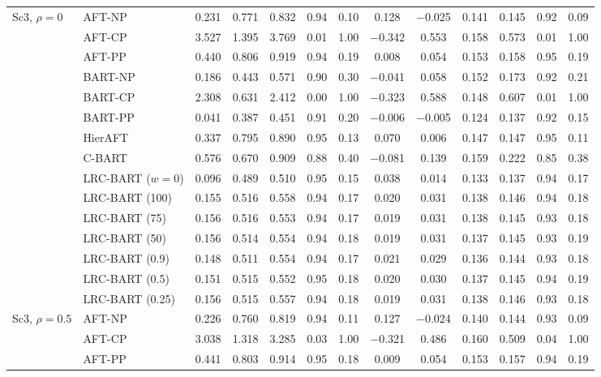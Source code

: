 \begin{center}
\begin{longtable}{llccccccccccc}
\midrule
\multirow{15}{*}{Sc3, $\rho=0$} & AFT-NP & 0.231 & 0.771 & 0.832 & 0.94 & 0.10 & 0.128 & $-$0.025 & 0.141 & 0.145 & 0.92 & 0.09 \\
& AFT-CP & 3.527 & 1.395 & 3.769 & 0.01 & 1.00 & $-$0.342 & 0.553 & 0.158 & 0.573 & 0.01 & 1.00 \\
& AFT-PP & 0.440 & 0.806 & 0.919 & 0.94 & 0.19 & 0.008 & 0.054 & 0.153 & 0.158 & 0.95 & 0.19 \\
& BART-NP & 0.186 & 0.443 & 0.571 & 0.90 & 0.30 & $-$0.041 & 0.058 & 0.152 & 0.173 & 0.92 & 0.21 \\
& BART-CP & 2.308 & 0.631 & 2.412 & 0.00 & 1.00 & $-$0.323 & 0.588 & 0.148 & 0.607 & 0.01 & 1.00 \\
& BART-PP & 0.041 & 0.387 & 0.451 & 0.91 & 0.20 & $-$0.006 & $-$0.005 & 0.124 & 0.137 & 0.92 & 0.15 \\
& HierAFT & 0.337 & 0.795 & 0.890 & 0.95 & 0.13 & 0.070 & 0.006 & 0.147 & 0.147 & 0.95 & 0.11 \\
& C-BART & 0.576 & 0.670 & 0.909 & 0.88 & 0.40 & $-$0.081 & 0.139 & 0.159 & 0.222 & 0.85 & 0.38 \\
& LRC-BART ($w=0$) & 0.096 & 0.489 & 0.510 & 0.95 & 0.15 & 0.038 & 0.014 & 0.133 & 0.137 & 0.94 & 0.17 \\
& LRC-BART (100) & 0.155 & 0.516 & 0.558 & 0.94 & 0.17 & 0.020 & 0.031 & 0.138 & 0.146 & 0.94 & 0.18 \\
& LRC-BART (75) & 0.156 & 0.516 & 0.553 & 0.94 & 0.17 & 0.019 & 0.031 & 0.138 & 0.145 & 0.93 & 0.18 \\
& LRC-BART (50) & 0.156 & 0.514 & 0.554 & 0.94 & 0.18 & 0.019 & 0.031 & 0.137 & 0.145 & 0.93 & 0.19 \\
& LRC-BART (0.9) & 0.148 & 0.511 & 0.554 & 0.94 & 0.17 & 0.021 & 0.029 & 0.136 & 0.144 & 0.93 & 0.18 \\
& LRC-BART (0.5) & 0.151 & 0.515 & 0.552 & 0.95 & 0.18 & 0.020 & 0.030 & 0.137 & 0.145 & 0.94 & 0.19 \\
& LRC-BART (0.25) & 0.156 & 0.515 & 0.557 & 0.94 & 0.18 & 0.019 & 0.031 & 0.138 & 0.146 & 0.93 & 0.18 \\
\midrule
\multirow{15}{*}{Sc3, $\rho=0.5$} & AFT-NP & 0.226 & 0.760 & 0.819 & 0.94 & 0.11 & 0.127 & $-$0.024 & 0.140 & 0.144 & 0.93 & 0.09 \\
& AFT-CP & 3.038 & 1.318 & 3.285 & 0.03 & 1.00 & $-$0.321 & 0.486 & 0.160 & 0.509 & 0.04 & 1.00 \\
& AFT-PP & 0.441 & 0.803 & 0.914 & 0.95 & 0.18 & 0.009 & 0.054 & 0.153 & 0.157 & 0.94 & 0.19 \\

\end{longtable}
\end{center}
